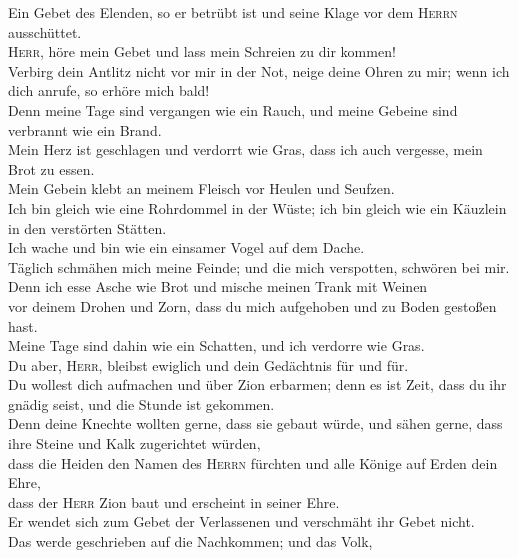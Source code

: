  Ein Gebet des Elenden, so er betrübt ist und seine Klage
vor dem \textsc{Herrn} ausschüttet.\\
 \textsc{Herr}, höre mein Gebet und lass mein Schreien zu
dir kommen!\\
 Verbirg dein Antlitz nicht vor mir in der Not, neige
deine Ohren zu mir; wenn ich dich anrufe, so erhöre mich bald!\\
 Denn meine Tage sind vergangen wie ein Rauch, und meine
Gebeine sind verbrannt wie ein Brand.\\
 Mein Herz ist geschlagen und verdorrt wie Gras, dass ich
auch vergesse, mein Brot zu essen.\\
 Mein Gebein klebt an meinem Fleisch vor Heulen und
Seufzen.\\
 Ich bin gleich wie eine Rohrdommel in der Wüste; ich bin
gleich wie ein Käuzlein in den verstörten Stätten.\\
 Ich wache und bin wie ein einsamer Vogel auf dem Dache.\\
 Täglich schmähen mich meine Feinde; und die mich
verspotten, schwören bei mir.\\
 Denn ich esse Asche wie Brot und mische meinen Trank mit
Weinen\\
 vor deinem Drohen und Zorn, dass du mich aufgehoben und
zu Boden gestoßen hast.\\
 Meine Tage sind dahin wie ein Schatten, und ich verdorre
wie Gras.\\
 Du aber, \textsc{Herr}, bleibst ewiglich und dein
Gedächtnis für und für.\\
 Du wollest dich aufmachen und über Zion erbarmen; denn
es ist Zeit, dass du ihr gnädig seist, und die Stunde ist gekommen.\\
 Denn deine Knechte wollten gerne, dass sie gebaut würde,
und sähen gerne, dass ihre Steine und Kalk zugerichtet würden,\\
 dass die Heiden den Namen des \textsc{Herrn} fürchten
und alle Könige auf Erden dein Ehre,\\
 dass der \textsc{Herr} Zion baut und erscheint in seiner
Ehre.\\
 Er wendet sich zum Gebet der Verlassenen und verschmäht
ihr Gebet nicht.\\
 Das werde geschrieben auf die Nachkommen; und das Volk,
